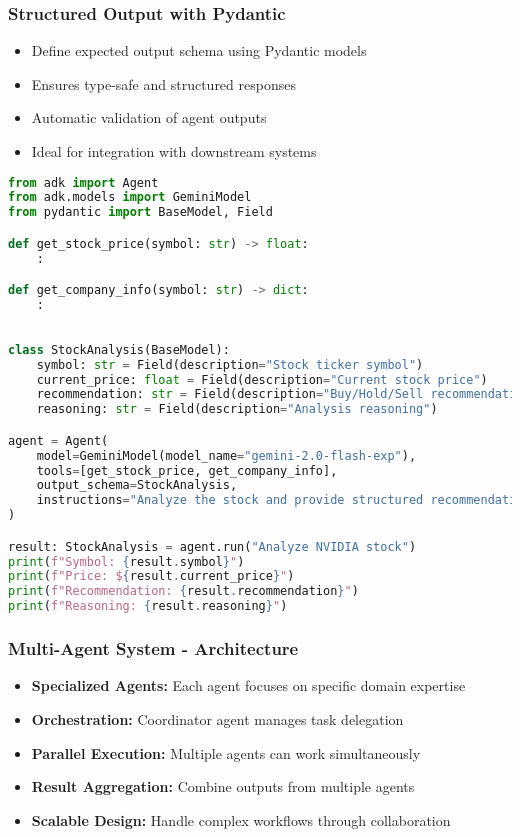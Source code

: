 \begin{frame}[fragile]\frametitle{Structured Output with Pydantic}
      \begin{itemize}
	\item Define expected output schema using Pydantic models
	\item Ensures type-safe and structured responses
	\item Automatic validation of agent outputs
	\item Ideal for integration with downstream systems
	  \end{itemize}
      
      \begin{lstlisting}[language=python, basicstyle=\tiny]
from adk import Agent
from adk.models import GeminiModel
from pydantic import BaseModel, Field

def get_stock_price(symbol: str) -> float:
    :

def get_company_info(symbol: str) -> dict:
    :
			
			
class StockAnalysis(BaseModel):
    symbol: str = Field(description="Stock ticker symbol")
    current_price: float = Field(description="Current stock price")
    recommendation: str = Field(description="Buy/Hold/Sell recommendation")
    reasoning: str = Field(description="Analysis reasoning")

agent = Agent(
    model=GeminiModel(model_name="gemini-2.0-flash-exp"),
    tools=[get_stock_price, get_company_info],
    output_schema=StockAnalysis,
    instructions="Analyze the stock and provide structured recommendation."
)

result: StockAnalysis = agent.run("Analyze NVIDIA stock")
print(f"Symbol: {result.symbol}")
print(f"Price: ${result.current_price}")
print(f"Recommendation: {result.recommendation}")
print(f"Reasoning: {result.reasoning}")
      \end{lstlisting}
\end{frame}

\begin{frame}[fragile]\frametitle{Multi-Agent System - Architecture}
      \begin{itemize}
	\item \textbf{Specialized Agents:} Each agent focuses on specific domain expertise
	\item \textbf{Orchestration:} Coordinator agent manages task delegation
	\item \textbf{Parallel Execution:} Multiple agents can work simultaneously
	\item \textbf{Result Aggregation:} Combine outputs from multiple agents
	\item \textbf{Scalable Design:} Handle complex workflows through collaboration
	  \end{itemize}
\end{frame}

